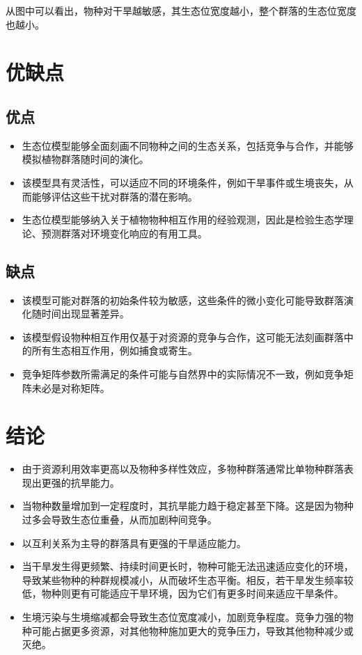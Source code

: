 \documentclass[11pt,a4paper]{ctexart}
\begin{document}
从图中可以看出，物种对干旱越敏感，其生态位宽度越小，整个群落的生态位宽度也越小。

\section{优缺点}

\subsection{优点}

\begin{itemize}
\item 生态位模型能够全面刻画不同物种之间的生态关系，包括竞争与合作，并能够模拟植物群落随时间的演化。
\item 该模型具有灵活性，可以适应不同的环境条件，例如干旱事件或生境丧失，从而能够评估这些干扰对群落的潜在影响。
\item 生态位模型能够纳入关于植物物种相互作用的经验观测，因此是检验生态学理论、预测群落对环境变化响应的有用工具。
\end{itemize}

\subsection{缺点}

\begin{itemize}
\item 该模型可能对群落的初始条件较为敏感，这些条件的微小变化可能导致群落演化随时间出现显著差异。
\item 该模型假设物种相互作用仅基于对资源的竞争与合作，这可能无法刻画群落中的所有生态相互作用，例如捕食或寄生。
\item 竞争矩阵参数所需满足的条件可能与自然界中的实际情况不一致，例如竞争矩阵未必是对称矩阵。
\end{itemize}

\section{结论}

\begin{itemize}
\item 由于资源利用效率更高以及物种多样性效应，多物种群落通常比单物种群落表现出更强的抗旱能力。
\item 当物种数量增加到一定程度时，其抗旱能力趋于稳定甚至下降。这是因为物种过多会导致生态位重叠，从而加剧种间竞争。
\item 以互利关系为主导的群落具有更强的干旱适应能力。
\item 当干旱发生得更频繁、持续时间更长时，物种可能无法迅速适应变化的环境，导致某些物种的种群规模减小，从而破坏生态平衡。相反，若干旱发生频率较低，物种则更有可能适应干旱环境，因为它们有更多时间来适应干旱条件。
\item 生境污染与生境缩减都会导致生态位宽度减小，加剧竞争程度。竞争力强的物种可能占据更多资源，对其他物种施加更大的竞争压力，导致其他物种减少或灭绝。
\end{itemize}
\end{document}
